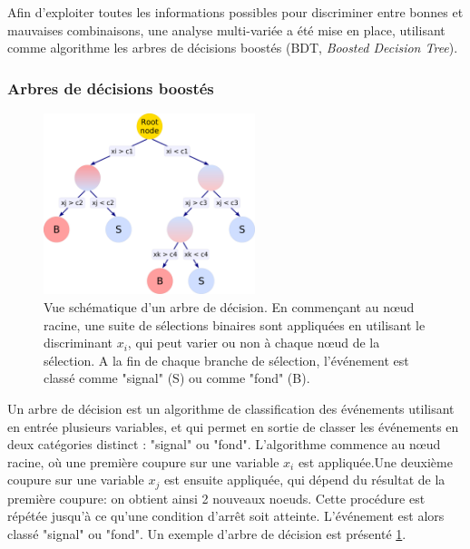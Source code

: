 Afin d'exploiter toutes les informations possibles pour discriminer entre bonnes et mauvaises combinaisons, une analyse multi-variée a été mise en place, utilisant comme algorithme les arbres de décisions boostés (BDT, \emph{Boosted Decision Tree}).


\subsubsection{Arbres de décisions boostés}

\begin{figure}[tbp] \centering
    \includegraphics[width=0.55\textwidth]{chapitre6/figs/BDT.pdf}
    \caption{Vue schématique d'un arbre de décision. En commençant au nœud racine, une suite de sélections binaires sont appliquées en utilisant le discriminant $x_i$, qui peut varier ou non à chaque nœud de la sélection. A la fin de chaque branche de sélection, l'événement est classé comme "signal" (S) ou comme "fond" (B).}
    \label{fig:bdt}
\end{figure}

Un arbre de décision est un algorithme de classification des événements utilisant en entrée plusieurs variables, et qui permet en sortie de classer les événements en deux catégories distinct : "signal" ou "fond". L'algorithme commence au nœud racine, où une première coupure sur une variable $x_i$ est appliquée.Une deuxième coupure sur une variable $x_j$ est ensuite appliquée, qui dépend du résultat de la première coupure: on obtient ainsi 2 nouveaux noeuds. Cette procédure est répétée jusqu'à ce qu'une condition d'arrêt soit atteinte. L'événement est alors classé "signal" ou "fond". Un exemple d'arbre de décision est présenté \cref{fig:bdt}.

